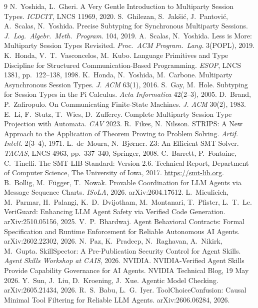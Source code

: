 \documentclass{article}
\theoremstyle{plain}
\theoremstyle{definition}
\newcommand{\bnew}{\begingroup\color{revblue}}
\newcommand{\bnew}{\begingroup}
\newcommand{\enew}{\endgroup}
\newcommand{\new}[1]{{\bnew #1\enew}}
\begin{document}
\begin{thebibliography}{9}
 N.~Yoshida, L.~Gheri. A Very Gentle Introduction to Multiparty Session Types. \emph{ICDCIT}, LNCS 11969, 2020.
 S.~Ghilezan, S.~Jak\v si\'c, J.~Pantovi\'c, A.~Scalas, N.~Yoshida. Precise Subtyping for Synchronous Multiparty Sessions. \emph{J.\ Log.\ Algebr.\ Meth.\ Program.} 104, 2019.
 A.~Scalas, N.~Yoshida. Less is More: Multiparty Session Types Revisited. \emph{Proc.\ ACM Program.\ Lang.} 3(POPL), 2019.
 K.~Honda, V.~T.~Vasconcelos, M.~Kubo. Language Primitives and Type Discipline for Structured Communication-Based Programming. \emph{ESOP}, LNCS 1381, pp.~122--138, 1998.
 K.~Honda, N.~Yoshida, M.~Carbone. Multiparty Asynchronous Session Types. \emph{J. ACM} 63(1), 2016.
 S.~Gay, M.~Hole. Subtyping for Session Types in the Pi Calculus. \emph{Acta Informatica} 42(2--3), 2005.
 D.~Brand, P.~Zafiropulo. On Communicating Finite-State Machines. \emph{J. ACM} 30(2), 1983.
 E.~Li, F.~Stutz, T.~Wies, D.~Zufferey. Complete Multiparty Session Type Projection with Automata. \emph{CAV} 2023.
 R.~Fikes, N.~Nilsson. STRIPS: A New Approach to the Application of Theorem Proving to Problem Solving. \emph{Artif. Intell.} 2(3--4), 1971.
 L.~de~Moura, N.~Bj{\o}rner. Z3: An Efficient SMT Solver. \emph{TACAS}, LNCS 4963, pp.~337--340, Springer, 2008.
 C.~Barrett, P.~Fontaine, C.~Tinelli. The SMT-LIB Standard: Version 2.6. Technical Report, Department of Computer Science, The University of Iowa, 2017. \url{https://smt-lib.org}.
 B.~Bollig, M.~F\"ugger, T.~Nowak. Provable Coordination for LLM Agents via Message Sequence Charts. \emph{ISoLA}, 2026. arXiv:2604.17612.
 L.~Miculicich, M.~Parmar, H.~Palangi, K.~D.~Dvijotham, M.~Montanari, T.~Pfister, L.~T.~Le. VeriGuard: Enhancing LLM Agent Safety via Verified Code Generation. arXiv:2510.05156, 2025.
 V.~P.~Bhardwaj. Agent Behavioral Contracts: Formal Specification and Runtime Enforcement for Reliable Autonomous AI Agents. arXiv:2602.22302, 2026.
 N.~Paz, K.~Pradeep, N.~Raghavan, A.~Nikirk, M.~Gupta. SkillSpector: A Pre-Publication Security Control for Agent Skills. \emph{Agent Skills Workshop at CAIS}, 2026.
 NVIDIA. NVIDIA-Verified Agent Skills Provide Capability Governance for AI Agents. NVIDIA Technical Blog, 19 May 2026.
 \new{Y.~Sun, J.~Liu, D.~Kroening, J.~Xue. Agentic Model Checking. arXiv:2605.21434, 2026.}
 \new{R.~S.~Babu, L.~G.~Iyer. ToolChoiceConfusion: Causal Minimal Tool Filtering for Reliable LLM Agents. arXiv:2606.06284, 2026.}

\end{thebibliography}
\end{document}
